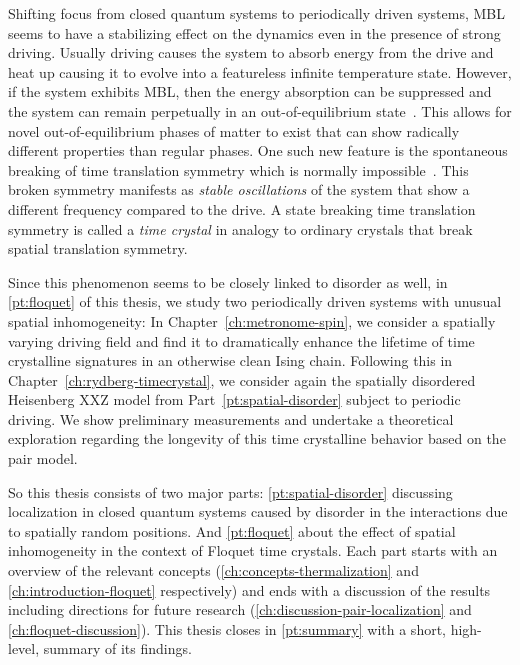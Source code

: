 Shifting focus from closed quantum systems to periodically driven systems, MBL seems to have a stabilizing effect on the dynamics even in the presence of strong driving. Usually driving causes the system to absorb energy from the drive and heat up causing it to evolve into a featureless infinite temperature state. However, if the system exhibits MBL, then the energy absorption can be suppressed and the system can remain perpetually in an out-of-equilibrium state~\cite{abaninTheoryManybodyLocalization2016,elsePrethermalPhasesMatter2017,bordiaPeriodicallyDrivingManyBody2017,elseDiscreteTimeCrystals2020a}. This allows for novel out-of-equilibrium phases of matter to exist that can show radically different properties than regular phases. One such new feature is the spontaneous breaking of time translation symmetry which is normally impossible~\cite{watanabeAbsenceQuantumTime2015}. This broken symmetry manifests as \emph{stable oscillations} of the system that show a different frequency compared to the drive. A state breaking time translation symmetry is called a \emph{time crystal} in analogy to ordinary crystals that break spatial translation symmetry. 

Since this phenomenon seems to be closely linked to disorder as well, in \autoref{pt:floquet} of this thesis, we study two periodically driven systems with unusual spatial inhomogeneity: In Chapter~\ref{ch:metronome-spin}, we consider a spatially varying driving field and find it to dramatically enhance the lifetime of time crystalline signatures in an otherwise clean Ising chain. Following this in Chapter~\ref{ch:rydberg-timecrystal}, we consider again the spatially disordered Heisenberg XXZ model from Part~\ref{pt:spatial-disorder} subject to periodic driving. We show preliminary measurements and undertake a theoretical 
exploration regarding the longevity of this time crystalline behavior based on the pair model.

So this thesis consists of two major parts: \autoref{pt:spatial-disorder} discussing localization in closed quantum systems caused by disorder in the interactions due to spatially random positions. And \autoref{pt:floquet} about the effect of spatial inhomogeneity in the context of Floquet time crystals.
Each part starts with an overview of the relevant concepts (\autoref{ch:concepts-thermalization} and \autoref{ch:introduction-floquet} respectively) and ends with a discussion of the results including directions for future research (\autoref{ch:discussion-pair-localization} and \autoref{ch:floquet-discussion}). This thesis closes in \autoref{pt:summary} with a short, high-level, summary of its findings.

